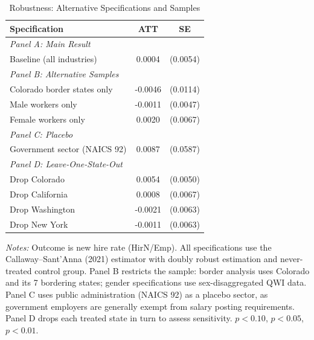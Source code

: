 \begin{table}[H]
\centering
\caption{Robustness: Alternative Specifications and Samples}
\label{tab:robustness}
\begin{threeparttable}
\begin{tabular}{lcc}
\toprule
Specification & ATT & SE \\
\midrule
\textit{Panel A: Main Result} & & \\
Baseline (all industries) & 0.0004 & (0.0054) \\
\midrule
\textit{Panel B: Alternative Samples} & & \\
Colorado border states only & -0.0046 & (0.0114) \\
Male workers only & -0.0011 & (0.0047) \\
Female workers only & 0.0020 & (0.0067) \\
\midrule
\textit{Panel C: Placebo} & & \\
Government sector (NAICS 92) & 0.0087 & (0.0587) \\
\midrule
\textit{Panel D: Leave-One-State-Out} & & \\
Drop Colorado & 0.0054 & (0.0050) \\
Drop California & 0.0008 & (0.0067) \\
Drop Washington & -0.0021 & (0.0063) \\
Drop New York & -0.0011 & (0.0063) \\
\bottomrule
\end{tabular}
\begin{tablenotes}[flushleft]
\small
\item \textit{Notes:} Outcome is new hire rate (HirN/Emp). All specifications use the Callaway--Sant'Anna (2021) estimator with doubly robust estimation and never-treated control group. Panel B restricts the sample: border analysis uses Colorado and its 7 bordering states; gender specifications use sex-disaggregated QWI data. Panel C uses public administration (NAICS 92) as a placebo sector, as government employers are generally exempt from salary posting requirements. Panel D drops each treated state in turn to assess sensitivity. \sym{*} \(p<0.10\), \sym{**} \(p<0.05\), \sym{***} \(p<0.01\).
\end{tablenotes}
\end{threeparttable}
\end{table}
